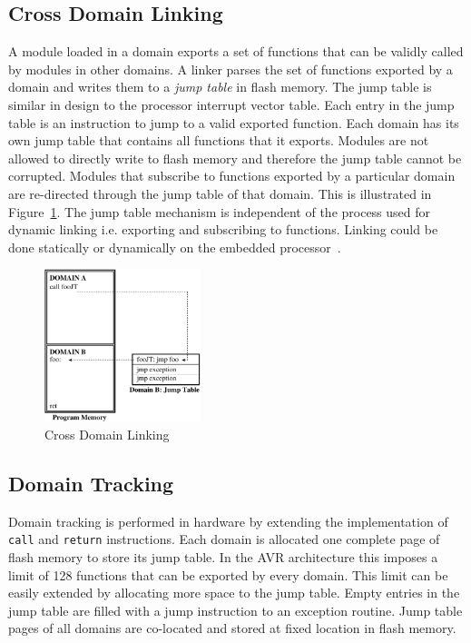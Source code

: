\subsection{Cross Domain Linking}
%
A module loaded in a domain exports a set of functions that can be validly called by modules in other domains.
%
%
%
A linker parses the set of functions exported by a domain and writes them to a \textit{jump table} in flash memory.
%
The jump table is similar in design to the processor interrupt vector table.
%
Each entry in the jump table is an instruction to jump to a valid exported function.
%
Each domain has its own jump table that contains all functions that it exports. 
%
Modules are not allowed to directly write to flash memory and therefore the jump table cannot be corrupted.
%
Modules that subscribe to functions exported by a particular domain are re-directed through the jump table of that domain.
%
This is illustrated in Figure~\ref{fig:cross_domain_call}.
%
The jump table mechanism is independent of the process used for dynamic linking i.e. exporting and subscribing to functions.
%
Linking could be done statically or dynamically on the embedded processor~\cite{dunkels06linking}.
%
\begin{figure}[htbp]
   \centering
   \includegraphics[height=1.75in, keepaspectratio=true]{figures/cross_domain_call.eps} 
   \caption{Cross Domain Linking}
   \label{fig:cross_domain_call}
\end{figure}
%
\subsection{Domain Tracking}
%
Domain tracking is performed in hardware by extending the implementation of \texttt{call} and \texttt{return} instructions.
%
Each domain is allocated one complete page of flash memory to store its jump table.
%
In the AVR architecture this imposes a limit of 128 functions that can be exported by every domain.
%
This limit can be easily extended by allocating more space to the jump table.
%
%
Empty entries in the jump table are filled with a jump instruction to an exception routine.
%
Jump table pages of all domains are co-located and stored at fixed location in flash memory.
%

